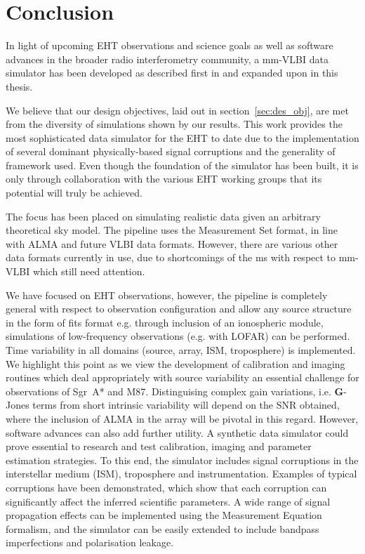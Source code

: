 \chapter{Conclusion} %

In light of upcoming EHT observations and science goals as well as software advances in the broader radio interferometry community, a mm-VLBI data simulator has been developed as described first in \citet{Blecher_2016} and  expanded upon in this thesis.

We believe that our design objectives, laid out in section~\ref{sec:des_obj}, are met from the diversity of simulations shown by our results. This work provides the most sophisticated data simulator for the EHT to date due to the implementation of several dominant physically-based signal corruptions and the generality of framework used. Even though the foundation of the simulator has been built, it is only through collaboration with the various EHT working groups that its potential will truly be achieved.


The focus has been placed on simulating realistic data given an arbitrary theoretical sky model. The pipeline uses the {\sc Measurement Set} format, in line with ALMA and future VLBI data formats. However, there are various other data formats currently in use, due to shortcomings of the {\sc ms} with respect to mm-VLBI which still need attention. 


We have focused on EHT observations, however, the pipeline is completely general with respect to observation configuration and allow any source structure in the form of {\sc fits} format e.g. through inclusion of an ionospheric module, simulations of low-frequency observations (e.g. with LOFAR) can be performed. 
Time variability in all domains (source, array, ISM, troposphere) is implemented. We highlight this point as we view the development of calibration and imaging routines which deal appropriately with source variability an essential challenge for observations of Sgr~A* and M87. Distinguising complex gain variations, i.e. $\bm G$-Jones terms from short intrinsic variability will depend on the SNR obtained, where the inclusion of ALMA in the array will be pivotal in this regard. However, software advances can also add further utility. A synthetic data simulator could prove essential to research and test calibration, imaging and parameter estimation strategies.
To this end, the simulator includes signal corruptions in the interstellar medium (ISM), troposphere and instrumentation. Examples of typical corruptions have been demonstrated, which show that each corruption can significantly affect the inferred scientific parameters. A wide range of signal propagation effects can be implemented using the Measurement Equation formalism, and the simulator can be easily extended to include bandpass imperfections and polarisation leakage.


